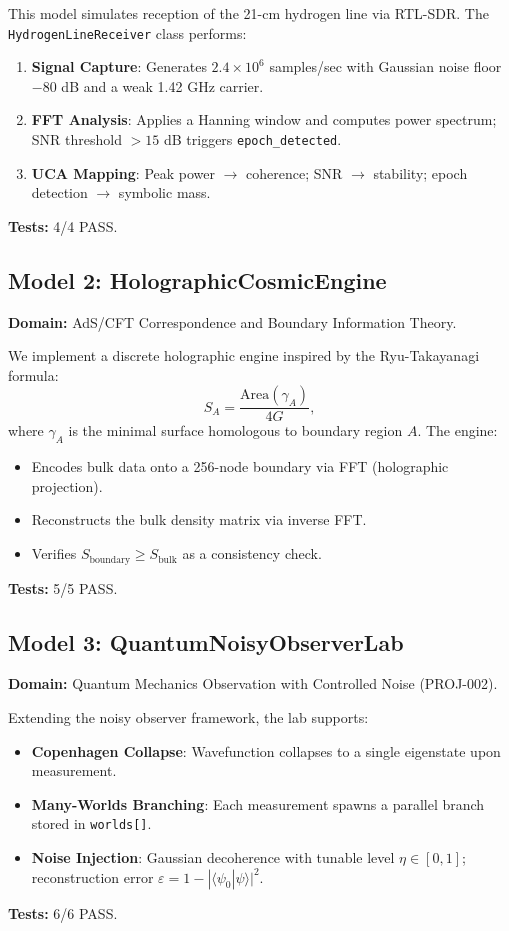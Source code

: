 \documentclass[12pt,a4paper]{article}
\theoremstyle{definition}
\begin{document}
This model simulates reception of the 21-cm hydrogen line via RTL-SDR. The \texttt{HydrogenLineReceiver} class performs:
\begin{enumerate}
    \item \textbf{Signal Capture}: Generates $2.4 \times 10^6$ samples/sec with Gaussian noise floor $-80$ dB and a weak 1.42 GHz carrier.
    \item \textbf{FFT Analysis}: Applies a Hanning window and computes power spectrum; SNR threshold $> 15$ dB triggers \texttt{epoch\_detected}.
    \item \textbf{UCA Mapping}: Peak power $\rightarrow$ coherence; SNR $\rightarrow$ stability; epoch detection $\rightarrow$ symbolic mass.
\end{enumerate}
\textbf{Tests:} 4/4 PASS.

\subsection{Model 2: HolographicCosmicEngine}
\textbf{Domain:} AdS/CFT Correspondence and Boundary Information Theory.

We implement a discrete holographic engine inspired by the Ryu-Takayanagi formula:
\begin{equation}
    S_A = \frac{\text{Area}(\gamma_A)}{4G},
\end{equation}
where $\gamma_A$ is the minimal surface homologous to boundary region $A$. The engine:
\begin{itemize}
    \item Encodes bulk data onto a 256-node boundary via FFT (holographic projection).
    \item Reconstructs the bulk density matrix via inverse FFT.
    \item Verifies $S_{\text{boundary}} \geq S_{\text{bulk}}$ as a consistency check.
\end{itemize}
\textbf{Tests:} 5/5 PASS.

\subsection{Model 3: QuantumNoisyObserverLab}
\textbf{Domain:} Quantum Mechanics Observation with Controlled Noise (PROJ-002).

Extending the noisy observer framework, the lab supports:
\begin{itemize}
    \item \textbf{Copenhagen Collapse}: Wavefunction collapses to a single eigenstate upon measurement.
    \item \textbf{Many-Worlds Branching}: Each measurement spawns a parallel branch stored in \texttt{worlds[]}.
    \item \textbf{Noise Injection}: Gaussian decoherence with tunable level $\eta \in [0,1]$; reconstruction error $\varepsilon = 1 - |\langle \psi_0 | \psi \rangle|^2$.
\end{itemize}
\textbf{Tests:} 6/6 PASS.
\end{document}
